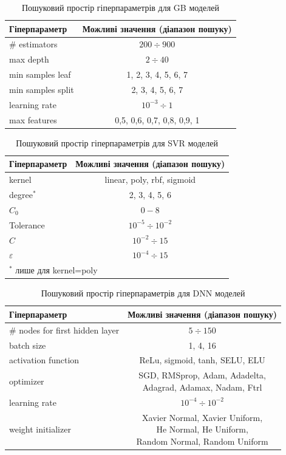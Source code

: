 \documentclass[10pt,a5paper,titlepage,oneside]{book}
\numberwithin{equation}{part}
\begin{document}
\begin{table}[!ht]
\caption{Пошуковий простір гіперпараметрів для GB моделей }
\label{tblGBs}
\centering
\begin{tabular}{|l|c|}
\hline
Гіперпараметр&Можливі значення (діапазон пошуку)\\
\hline
\# estimators&	$200\div900$\\
\hline
max depth&	$2\div40$\\
\hline
min samples leaf &	1, 2, 3, 4, 5, 6, 7\\
\hline
min samples split	&2, 3, 4, 5, 6, 7\\
\hline
learning rate	& $10^{-3}\div1$ \\
\hline
max features &	0,5, 0,6, 0,7, 0,8, 0,9, 1\\
\hline
\end{tabular}
\end{table}

\begin{table}[!ht]
\caption{Пошуковий простір гіперпараметрів для SVR моделей }
\label{tblSVRs}
\centering
\begin{tabular}{|l|c|}
\hline
Гіперпараметр&Можливі значення (діапазон пошуку)\\
\hline
kernel &	linear, poly, rbf, sigmoid\\
\hline
degree$^*$&	2, 3, 4, 5, 6\\
\hline
$C_0$ &	$0-8$\\
\hline
Tolerance	&$10^{-5}\div10^{-2}$\\
\hline
$C$	& $10^{-2}\div15$ \\
\hline
$\varepsilon$ &	$10^{-4}\div15$\\
\hline
\multicolumn{2}{l}{$^*$ лише для kernel=poly}\\
\end{tabular}
\end{table}

\begin{table}[!ht]
\caption{Пошуковий простір гіперпараметрів для DNN моделей }
\label{tblDNNs}
\centering
\begin{tabular}{|l|c|}
\hline
Гіперпараметр&Можливі значення (діапазон пошуку)\\
\hline
\# nodes for first hidden layer &$5\div150$\\
\hline
batch size&	1, 4, 16\\
\hline
activation function &	ReLu, sigmoid, tanh, SELU, ELU\\
\hline
optimizer	&\makecell{SGD, RMSprop, Adam, Adadelta, \\Adagrad, Adamax, Nadam, Ftrl}\\
\hline
learning rate	& $10^{-4}\div10^{-2}$ \\
\hline
weight initializer &	\makecell{Xavier Normal, Xavier Uniform, \\He Normal, He Uniform, \\Random Normal, Random Uniform}\\
\hline
\end{tabular}
\end{table}
\end{document}
